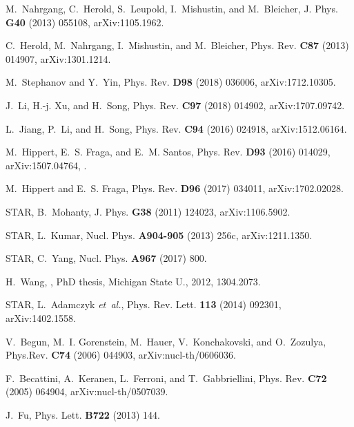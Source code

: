 \documentclass[secnumarabic, graphics,floatfix, nofootinbib,tightenlines,nobibnotes, aps, prl, 12pt]{revtex4-1}
\begin{document}
\begin{thebibliography}{10}
M.~Nahrgang, C.~Herold, S.~Leupold, I.~Mishustin, and M.~Bleicher,
\newblock J. Phys. {\bf G40} (2013) 055108, arXiv:1105.1962.

C.~Herold, M.~Nahrgang, I.~Mishustin, and M.~Bleicher,
\newblock Phys. Rev. {\bf C87} (2013) 014907, arXiv:1301.1214.

M.~Stephanov and Y.~Yin,
\newblock Phys. Rev. {\bf D98} (2018) 036006, arXiv:1712.10305.

J.~Li, H.-j. Xu, and H.~Song,
\newblock Phys. Rev. {\bf C97} (2018) 014902, arXiv:1707.09742.

L.~Jiang, P.~Li, and H.~Song,
\newblock Phys. Rev. {\bf C94} (2016) 024918, arXiv:1512.06164.

M.~Hippert, E.~S. Fraga, and E.~M. Santos,
\newblock Phys. Rev. {\bf D93} (2016) 014029, arXiv:1507.04764,
.

M.~Hippert and E.~S. Fraga,
\newblock Phys. Rev. {\bf D96} (2017) 034011, arXiv:1702.02028.

STAR, B.~Mohanty,
\newblock J. Phys. {\bf G38} (2011) 124023, arXiv:1106.5902.

STAR, L.~Kumar,
\newblock Nucl. Phys. {\bf A904-905} (2013) 256c, arXiv:1211.1350.

STAR, C.~Yang,
\newblock Nucl. Phys. {\bf A967} (2017) 800.

H.~Wang,
,
\newblock PhD thesis, Michigan State U., 2012, 1304.2073.

STAR, L.~Adamczyk {\em et~al.},
\newblock Phys. Rev. Lett. {\bf 113} (2014) 092301, arXiv:1402.1558.

V.~Begun, M.~I. Gorenstein, M.~Hauer, V.~Konchakovski, and O.~Zozulya,
\newblock Phys.Rev. {\bf C74} (2006) 044903, arXiv:nucl-th/0606036.

F.~Becattini, A.~Keranen, L.~Ferroni, and T.~Gabbriellini,
\newblock Phys. Rev. {\bf C72} (2005) 064904, arXiv:nucl-th/0507039.

J.~Fu,
\newblock Phys. Lett. {\bf B722} (2013) 144.


\end{thebibliography}
\end{document}
